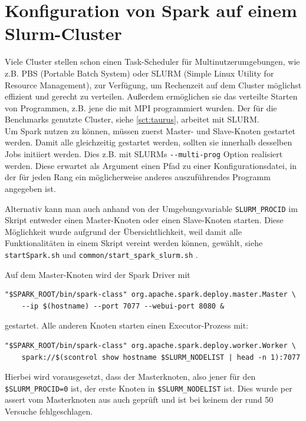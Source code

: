 \section{Konfiguration von Spark auf einem Slurm-Cluster}

Viele Cluster stellen schon einen Task-Scheduler für Multinutzerumgebungen, wie z.B. PBS (Portable Batch System) oder SLURM (Simple Linux Utility for Resource Management), zur Verfügung, um Rechenzeit auf dem Cluster möglichst effizient und gerecht zu verteilen.
Außerdem ermöglichen sie das verteilte Starten von Programmen, z.B. jene die mit MPI programmiert wurden.
Der für die Benchmarks genutzte Cluster, siehe \autoref{sct:taurus}, arbeitet mit SLURM.\\

Um Spark nutzen zu können, müssen zuerst Master- und Slave-Knoten gestartet werden.
Damit alle gleichzeitig gestartet werden, sollten sie innerhalb desselben Jobs initiiert werden.
Dies z.B. mit SLURMs \lstinline!--multi-prog! Option realisiert werden.
Diese erwartet als Argument einen Pfad zu einer Konfigurationsdatei, in der für jeden Rang ein möglicherweise anderes auszuführendes Programm angegeben ist.

Alternativ kann man auch anhand von der Umgebungsvariable \lstinline!SLURM_PROCID! im Skript entweder einen Master-Knoten oder einen Slave-Knoten starten.
Diese Möglichkeit wurde aufgrund der Übersichtlichkeit, weil damit alle Funktionalitäten in einem Skript vereint werden können, gewählt, siehe \lstinline!startSpark.sh! und \lstinline!common/start_spark_slurm.sh! \cite{scaromare}.

Auf dem Master-Knoten wird der Spark Driver mit
\begin{lstlisting}
"$SPARK_ROOT/bin/spark-class" org.apache.spark.deploy.master.Master \
    --ip $(hostname) --port 7077 --webui-port 8080 &
\end{lstlisting}\vspace{-1.5\baselineskip}
gestartet.
Alle anderen Knoten starten einen Executor-Prozess mit:
\begin{lstlisting}
"$SPARK_ROOT/bin/spark-class" org.apache.spark.deploy.worker.Worker \
    spark://$(scontrol show hostname $SLURM_NODELIST | head -n 1):7077
\end{lstlisting}\vspace{-1.5\baselineskip}
Hierbei wird vorausgesetzt, dass der Masterknoten, also jener für den \lstinline!$SLURM_PROCID=0! ist, der erste Knoten in \lstinline!$SLURM_NODELIST! ist. Dies wurde per assert vom Masterknoten aus auch geprüft und ist bei keinem der rund 50 Versuche fehlgeschlagen.

